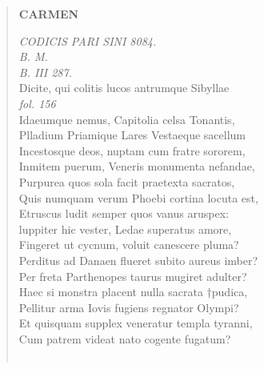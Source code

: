 \documentclass[11pt, a4paper]{report}
\begin{document}
\begin{verse}
    \begin{center} \textbf{CARMEN} \end{center}\textit{CODICIS PARI SINI 8084.} \\ \textit{B. M.} \\ \textit{B. III 287.} \\ Dicite, qui colitis lucos antrumque Sibyllae \\ \textit{fol. 156} \\ Idaeumque nemus, Capitolia celsa Tonantis, \\ Plladium Priamique Lares Vestaeque sacellum \\ Incestosque deos, nuptam cum fratre sororem, \\ Inmitem puerum, Veneris monumenta nefandae, \\ Purpurea quos sola facit praetexta sacratos, \\ Quis numquam verum Phoebi cortina locuta est, \\ Etruscus ludit semper quos vanus aruspex: \\ luppiter hic vester, Ledae superatus amore, \\ Fingeret ut cycnum, voluit canescere pluma? \\ Perditus ad Danaen flueret subito aureus imber? \\ Per freta Parthenopes
                    taurus mugiret adulter? \\ Haec si monstra placent nulla sacrata †pudica, \\ Pellitur arma Iovis fugiens regnator Olympi? \\ Et quisquam supplex veneratur templa tyranni, \\ Cum patrem videat nato cogente fugatum? \\ 
        ﻿\pagebreak 

\end{verse}
\end{document}
